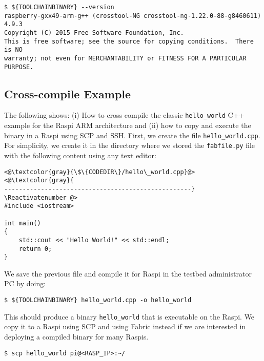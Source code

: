 \begin{lstlisting}[]
$ ${TOOLCHAINBINARY} --version
raspberry-gxx49-arm-g++ (crosstool-NG crosstool-ng-1.22.0-88-g8460611) 4.9.3
Copyright (C) 2015 Free Software Foundation, Inc.
This is free software; see the source for copying conditions.  There is NO
warranty; not even for MERCHANTABILITY or FITNESS FOR A PARTICULAR PURPOSE.
\end{lstlisting}
\FloatBarrier
\vspace{-5mm}

\subsection{Cross-compile Example}
The following shows: (i) How to cross compile the classic \texttt{hello\_world}
C++ example for the \ac{Raspi} ARM architecture and (ii) how to copy and
execute the binary in a \ac{Raspi} using \ac{SCP} and \ac{SSH}. First, we
create the file \texttt{hello\_world.cpp}. For simplicity, we create it
in the directory where we stored the \texttt{fabfile.py} file
with the following content using any text editor:

\Suppressnumber\begin{lstlisting}[]
<@\textcolor{gray}{\$\{CODEDIR\}/hello\_world.cpp}@>
<@\textcolor{gray}{
---------------------------------------------------}
\Reactivatenumber @>
#include <iostream>

int main()
{
    std::cout << "Hello World!" << std::endl;
    return 0;
}
\end{lstlisting}
\FloatBarrier
\vspace{-5mm}

We save the previous file and compile it for \ac{Raspi} in the testbed
administrator \ac{PC} by doing:

\begin{lstlisting}[]
$ ${TOOLCHAINBINARY} hello_world.cpp -o hello_world
\end{lstlisting}
\FloatBarrier
\vspace{-5mm}

This should produce a binary \texttt{hello\_world} that is executable
on the \ac{Raspi}. We copy it to a \ac{Raspi} using \ac{SCP} and using
Fabric instead if we are interested in deploying a compiled binary for
many \ac{Raspi}s.

\begin{lstlisting}[]
$ scp hello_world pi@<RASP_IP>:~/
\end{lstlisting}
\FloatBarrier
\vspace{-5mm}

